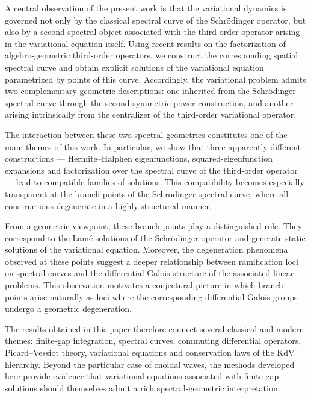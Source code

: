 \documentclass[a4paper,12pt]{article}
\begin{document}
A central observation of the present work is that the variational dynamics is governed not only by the classical spectral curve of the Schrödinger operator, but also by a second spectral object associated with the third-order operator arising in the variational equation itself. Using recent results on the factorization of algebro-geometric third-order operators, we construct the corresponding spatial spectral curve and obtain explicit solutions of the variational equation parametrized by points of this curve. Accordingly, the variational problem admits two complementary geometric descriptions: one inherited from the Schrödinger spectral curve through the second symmetric power construction, and another arising intrinsically from the centralizer of the third-order variational operator.

The interaction between these two spectral geometries constitutes one of the main themes of this work. In particular, we show that three apparently different constructions — Hermite–Halphen eigenfunctions, squared-eigenfunction expansions and factorization over the spectral curve of the third-order operator — lead to compatible families of solutions. This compatibility becomes especially transparent at the branch points of the Schrödinger spectral curve, where all constructions degenerate in a highly structured manner.

From a geometric viewpoint, these branch points play a distinguished role. They correspond to the Lamé solutions of the Schrödinger operator and generate static solutions of the variational equation. Moreover, the degeneration phenomena observed at these points suggest a deeper relationship between ramification loci on spectral curves and the differential-Galois structure of the associated linear problems. This observation motivates a conjectural picture in which branch points arise naturally as loci where the corresponding differential-Galois groups undergo a geometric degeneration.

The results obtained in this paper therefore connect several classical and modern themes: finite-gap integration, spectral curves, commuting differential operators, Picard–Vessiot theory, variational equations and conservation laws of the KdV hierarchy. Beyond the particular case of cnoidal waves, the methods developed here provide evidence that variational equations associated with finite-gap solutions should themselves admit a rich spectral-geometric interpretation.

\medskip

\end{document}
